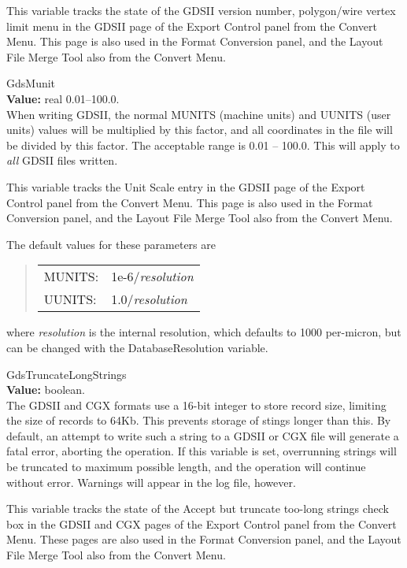 \begin{description}
This variable tracks the state of the {\cb GDSII version number,
polygon/wire vertex limit} menu in the {\cb GDSII} page of the {\cb
Export Control} panel from the {\cb Convert Menu}.  This page is also
used in the {\cb Format Conversion} panel, and the {\cb Layout File
Merge Tool} also from the {\cb Convert Menu}.

\item{\et GdsMunit}\\
{\bf Value:} real 0.01--100.0.\\
When writing GDSII, the normal MUNITS (machine units) and UUNITS (user
units) values will be multiplied by this factor, and all coordinates
in the file will be divided by this factor.  The acceptable range is
0.01 -- 100.0.  This will apply to {\it all} GDSII files written. 

This variable tracks the {\cb Unit Scale} entry in the {\cb GDSII}
page of the {\cb Export Control} panel from the {\cb Convert Menu}. 
This page is also used in the {\cb Format Conversion} panel, and the
{\cb Layout File Merge Tool} also from the {\cb Convert Menu}.

The default values for these parameters are
\begin{quote}
\begin{tabular}{ll}
MUNITS: & 1e-6/{\it resolution}\\
UUNITS: & 1.0/{\it resolution}\\
\end{tabular}
\end{quote}
where {\it resolution} is the internal resolution, which defaults to
1000 per-micron, but can be changed with the {\et DatabaseResolution}
variable.

\item{\et GdsTruncateLongStrings}\\
{\bf Value:} boolean.\\
The GDSII and CGX formats use a 16-bit integer to store record size,
limiting the size of records to 64Kb.  This prevents storage of stings
longer than this.  By default, an attempt to write such a string to a
GDSII or CGX file will generate a fatal error, aborting the operation. 
If this variable is set, overrunning strings will be truncated to
maximum possible length, and the operation will continue without
error.  Warnings will appear in the log file, however.

This variable tracks the state of the {\cb Accept but truncate
too-long strings} check box in the {\cb GDSII} and {\cb CGX} pages of
the {\cb Export Control} panel from the {\cb Convert Menu}.  These
pages are also used in the {\cb Format Conversion} panel, and the {\cb
Layout File Merge Tool} also from the {\cb Convert Menu}.


\end{description}
